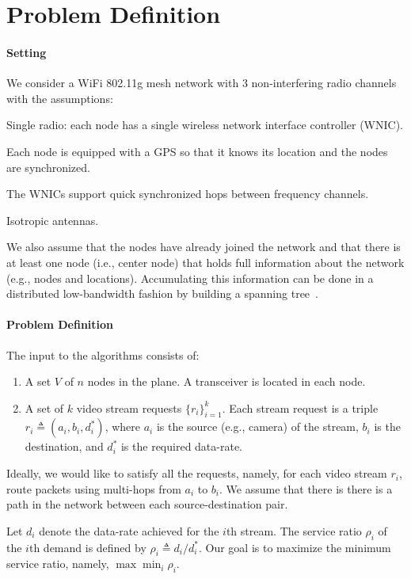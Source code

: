 \documentclass[12pt]{article}
\newenvironment{proof sketch}[1]{\noindent {\emph{Proof sketch of #1:}}}{\hfill \qed}
\newcommand{\eqdf}{\triangleq}
\begin{document}
\section{Problem Definition}\label{sec:problem}
\paragraph{Setting}
We consider a WiFi 802.11g mesh network with $3$ non-interfering radio
channels with the assumptions:
\begin{inparaenum}[(i)]
\item Single radio: each node has a single wireless network interface
  controller (WNIC).
\item Each node is equipped with a GPS so that it knows
  its location and the nodes are synchronized.
\item The WNICs support quick synchronized hops between frequency
  channels.
\item Isotropic antennas.
\item We also assume that the nodes have
already joined the network and that there is at least one node (i.e.,
center node) that holds full information about the network (e.g.,
nodes and locations).  Accumulating this information can be done in a
distributed low-bandwidth fashion by building a spanning
tree~\cite{awerbuch1987optimal}.
\end{inparaenum}




\paragraph{Problem Definition}
The input to the algorithms consists of:
\begin{enumerate}
\item A set $V$ of $n$ nodes in the plane. A transceiver is located in
  each node.
\item A set of $k$ video stream requests $\{r_i\}_{i=1}^k$. Each
  stream request is a triple $r_i\eqdf (a_i,b_i,d^*_i)$, where $a_i$ is
  the source (e.g., camera) of the stream, $b_i$ is the destination,
  and $d^*_i$ is the required data-rate.
\end{enumerate}
Ideally, we would like to satisfy all the requests, namely, for each
video stream $r_i$, route packets using multi-hops from $a_i$ to $b_i$.
We assume that there is there is a path in the network between each
source-destination pair.

Let $d_i$ denote the data-rate achieved for the $i$th stream.  The
service ratio $\rho_i$ of the $i$th demand is defined by $\rho_i \eqdf
d_i/d^*_i$.  Our goal is to maximize the minimum service ratio,
namely, $\max \min_i \rho_i$.
\end{document}
